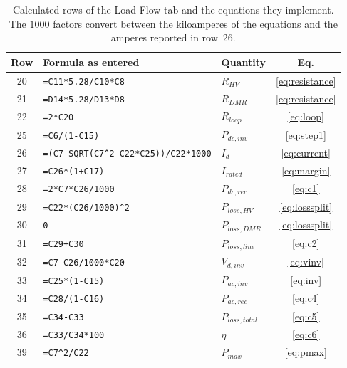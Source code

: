 \begin{table}[htbp]
  \centering
  \small
  \renewcommand{\arraystretch}{1.3}
  \begin{tabularx}{\linewidth}{@{}c X l c@{}}
    \toprule
    \textbf{Row} & \textbf{Formula as entered} & \textbf{Quantity} &
    \textbf{Eq.} \\
    \midrule
    20 & \texttt{=C11*5.28/C10*C8}
       & $R_{HV}$        & \eqref{eq:resistance} \\
    21 & \texttt{=D14*5.28/D13*D8}
       & $R_{DMR}$       & \eqref{eq:resistance} \\
    22 & \texttt{=2*C20}
       & $R_{loop}$      & \eqref{eq:loop} \\
    25 & \texttt{=C6/(1-C15)}
       & $P_{dc,inv}$    & \eqref{eq:step1} \\
    26 & \texttt{=(C7-SQRT(C7\textasciicircum{}2-C22*C25))/C22*1000}
       & $I_{d}$         & \eqref{eq:current} \\
    27 & \texttt{=C26*(1+C17)}
       & $I_{rated}$     & \eqref{eq:margin} \\
    28 & \texttt{=2*C7*C26/1000}
       & $P_{dc,rec}$    & \eqref{eq:c1} \\
    29 & \texttt{=C22*(C26/1000)\textasciicircum{}2}
       & $P_{loss,HV}$   & \eqref{eq:losssplit} \\
    30 & \texttt{0}
       & $P_{loss,DMR}$  & \eqref{eq:losssplit} \\
    31 & \texttt{=C29+C30}
       & $P_{loss,line}$ & \eqref{eq:c2} \\
    32 & \texttt{=C7-C26/1000*C20}
       & $V_{d,inv}$     & \eqref{eq:vinv} \\
    33 & \texttt{=C25*(1-C15)}
       & $P_{ac,inv}$    & \eqref{eq:inv} \\
    34 & \texttt{=C28/(1-C16)}
       & $P_{ac,rec}$    & \eqref{eq:c4} \\
    35 & \texttt{=C34-C33}
       & $P_{loss,total}$& \eqref{eq:c5} \\
    36 & \texttt{=C33/C34*100}
       & $\eta$          & \eqref{eq:c6} \\
    39 & \texttt{=C7\textasciicircum{}2/C22}
       & $P_{max}$       & \eqref{eq:pmax} \\
    \bottomrule
  \end{tabularx}
  \caption{Calculated rows of the Load Flow tab and the equations they
           implement. The $1000$ factors convert between the kiloamperes of
           the equations and the amperes reported in row~26.}
  \label{tab:formulas}
\end{table}

